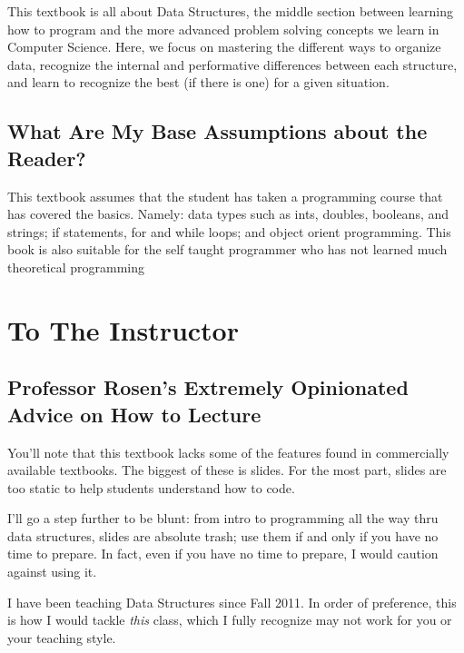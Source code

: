 This textbook is all about Data Structures, the middle section between learning how to program and the more advanced problem solving concepts we learn in Computer Science. 
Here, we focus on mastering the different ways to organize data, recognize the internal and performative differences between each structure, and learn to recognize the best (if there is one) for a given situation.


\subsection{What Are My Base Assumptions about the Reader?}

This textbook assumes that the student has taken a programming course that has covered the basics.
Namely: data types such as ints, doubles, booleans, and strings; if statements, for and while loops; and object orient programming.
This book is also suitable for the self taught programmer who has not learned much theoretical programming

\section{To The Instructor}


\subsection{Professor Rosen's Extremely Opinionated Advice on How to Lecture}
You'll note that this textbook lacks some of the features found in commercially available textbooks.  The biggest of these is slides.  
For the most part, slides are too static to help students understand how to code. 

I'll go a step further to be blunt: from intro to programming all the way thru data structures, slides are absolute trash;  use them if and only if you have no time to prepare.  In fact, even if you have no time to prepare, I would caution against using it.

I have been teaching Data Structures since Fall 2011.  In order of preference, this is how I would tackle \textit{this} class, which I fully recognize may not work for you or your teaching style.

